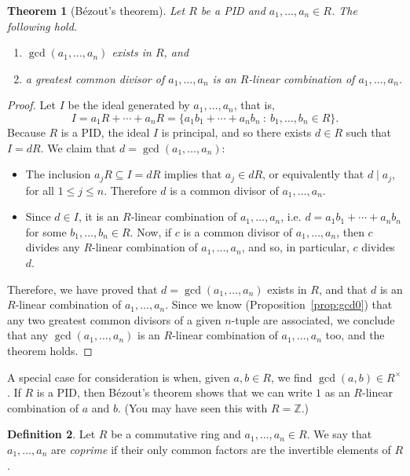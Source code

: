 \documentclass[12pt]{article}
\newtheorem{thm}{Theorem}[section]
\theoremstyle{definition}
\newtheorem{defn}[thm]{Definition}
\newcounter{ex}\renewcommand\theex{\arabic{ex}}
\newcommand{\Z}{\ensuremath{\mathbb{Z}}}
\begin{document}
\begin{thm}[B\'ezout's theorem]\label{thm:bezout}
Let $R$ be a PID and $a_1,\dots,a_n\in R$. The following hold.
\begin{enumerate}
\item $\gcd(a_1,\dots,a_n)$ exists in $R$, and
\item a greatest common divisor of $a_1,\dots,a_n$ is 
an $R$-linear combination of $a_1,\dots,a_n$. 
\end{enumerate}
\end{thm}

\begin{proof}
Let $I$ be the ideal generated by $a_1,\dots,a_n$, that is,
$$I=a_1R+\cdots+a_nR=\{a_1b_1+\cdots+a_nb_n~:~b_1,\dots,b_n\in R\}.$$
Because $R$ is a PID, the ideal $I$ is principal, and so there exists
$d\in R$ such that $I=dR$. We claim that $d=\gcd(a_1,\dots,a_n)$:
\begin{itemize}
\item The inclusion $a_jR\subseteq I=dR$ implies that $a_j\in dR$,
or equivalently that $d\mid a_j$, for all
$1\leq j\leq n$. Therefore $d$ is a common divisor of $a_1,\dots,a_n$.
\item Since $d\in I$, it is an $R$-linear combination of
$a_1,\dots,a_n$, i.e. $d=a_1b_1+\cdots+a_nb_n$ for some
$b_1,\dots,b_n\in R$. Now, if $c$ is a common divisor of
$a_1,\dots,a_n$, then $c$ divides any $R$-linear combination of
$a_1,\dots,a_n$, and so, in particular, $c$ divides $d$.
\end{itemize}
Therefore, we have proved that $d=\gcd(a_1,\dots,a_n)$ exists in $R$,
and that $d$ is an $R$-linear combination of $a_1,\dots,a_n$.
Since we know (Proposition~\ref{prop:gcd0}) that any two greatest
common divisors of a given $n$-tuple are associated, we conclude that
any $\gcd(a_1,\dots,a_n)$ is an $R$-linear combination of
$a_1,\dots,a_n$ too, and the theorem holds. 
\end{proof}

A special case for consideration is when, given $a,b\in R$, we find
$\gcd(a,b)\in R^\times$. If $R$ is a PID, then B\'ezout's theorem
shows that we can write $1$ as an $R$-linear combination of $a$ and
$b$. (You may have seen this with $R=\Z$.)

\begin{defn}\label{def:coprime}
Let $R$ be a commutative ring and $a_1,\dots,a_n\in R$. We say that
$a_1,\dots,a_n$ are {\em coprime} if 
their only common factors are the invertible elements of $R$.
\end{defn}
\end{document}
